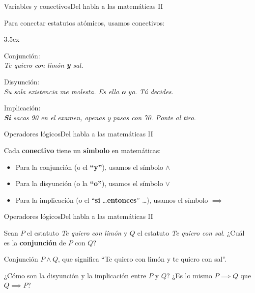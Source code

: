 \documentclass[spanish, c]{beamer}
\begin{document}
\begin{frame}{Variables y conectivos}{Del habla a las matemáticas II}
    
    Para conectar estatutos atómicos, usamos \alert{conectivos}: \pause

    \bigskip

    \begin{description}[<+->]
        \itemsep3.5ex
        \item \alert{Conjunción}: \\ \textit{Te quiero con limón \textbf<5->{y} sal.}
        \item \alert{Disyunción}: \\ \textit{Su sola existencia me molesta. Es ella \textbf<6->{o} yo. Tú decides.}
        \item \alert{Implicación}: \\ \textit{\textbf<7->{Si} sacas 90 en el examen,  apenas y pasas con 70. Ponte al tiro.}
    \end{description}

\end{frame}

\begin{frame}{Operadores lógicos}{Del habla a las matemáticas II}

    Cada \textbf{conectivo} tiene un \textbf{símbolo} en matemáticas: \pause

    \bigskip

    \begin{itemize}
        \itemsep2.5ex
        \item Para la conjunción (o el \textbf{``y''}), usamos el símbolo $\wedge$
        \item Para la disyunción (o la \textbf{``o''}), usamos el símbolo $\vee$
        \item Para la implicación (o el ``\textbf{si} \dots \textbf{entonces}'' \dots), usamos el símbolo $\implies$
    \end{itemize}

\end{frame}

\begin{frame}{Operadores lógicos}{Del habla a las matemáticas II}

    Sean $P$ el estatuto \textit{Te quiero con limón} y $Q$ el estatuto \textit{Te quiero con sal}. ¿Cuál es la \textbf{conjunción} de $P$ con $Q$? \pause

    \bigskip

    \begin{exampleblock}{Conjunción}
            $P \wedge Q$, que significa ``Te quiero con limón y te quiero con sal''.
    \end{exampleblock} \pause

    \bigskip

    ¿Cómo son la disyunción y la implicación entre $P$ y $Q$? \pause ¿Es lo mismo $P \implies Q$ que $Q \implies P$?

\end{frame}
\end{document}
